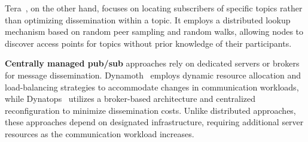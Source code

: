 Tera~\cite{Tera}, on the other hand, focuses on locating subscribers of specific topics rather than optimizing dissemination within a topic. 
It employs a distributed lookup mechanism based on random peer sampling and random walks, allowing nodes to discover access points for topics without prior knowledge of their participants.

\textbf{Centrally managed pub/sub} approaches rely on dedicated servers or brokers for message dissemination. 
Dynamoth~\cite{Dynamoth} employs dynamic resource allocation and load-balancing strategies to accommodate changes in communication workloads, while Dynatops~\cite{Dynatops} utilizes a broker-based architecture and centralized reconfiguration to minimize dissemination costs. 
Unlike distributed approaches, these approaches depend on designated infrastructure, requiring additional server resources as the communication workload increases.